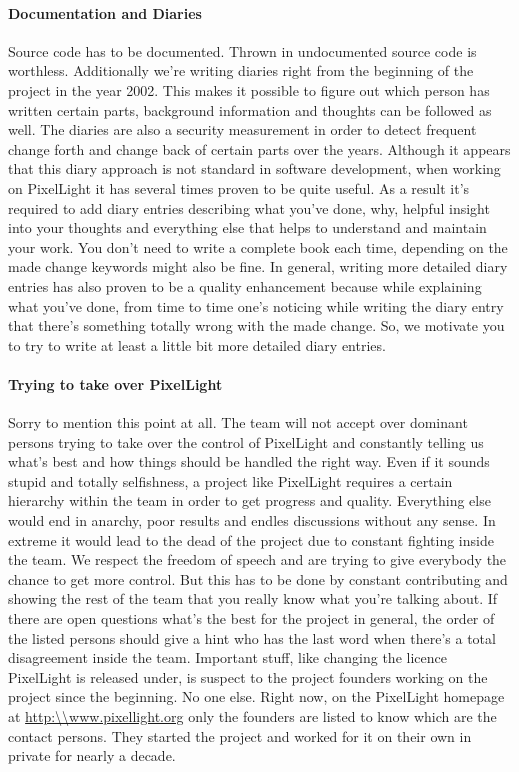\paragraph{Documentation and Diaries}
Source code has to be documented. Thrown in undocumented source code is worthless. Additionally we're writing diaries right from the beginning of the project in the year 2002. This makes it possible to figure out which person has written certain parts, background information and thoughts can be followed as well. The diaries are also a security measurement in order to detect frequent change forth and change back of certain parts over the years. Although it appears that this diary approach is not standard in software development, when working on PixelLight it has several times proven to be quite useful. As a result it's required to add diary entries describing what you've done, why, helpful insight into your thoughts and everything else that helps to understand and maintain your work. You don't need to write a complete book each time, depending on the made change keywords might also be fine. In general, writing more detailed diary entries has also proven to be a quality enhancement because while explaining what you've done, from time to time one's noticing while writing the diary entry that there's something totally wrong with the made change. So, we motivate you to try to write at least a little bit more detailed diary entries.


\paragraph{Trying to take over PixelLight}
Sorry to mention this point at all. The team will not accept over dominant persons trying to take over the control of PixelLight and constantly telling us what's best and how things should be handled the right way. Even if it sounds stupid and totally selfishness, a project like PixelLight requires a certain hierarchy within the team in order to get progress and quality. Everything else would end in anarchy, poor results and endles discussions without any sense. In extreme it would lead to the dead of the project due to constant fighting inside the team. We respect the freedom of speech and are trying to give everybody the chance to get more control. But this has to be done by constant contributing and showing the rest of the team that you really know what you're talking about. If there are open questions what's the best for the project in general, the order of the listed persons should give a hint who has the last word when there's a total disagreement inside the team. Important stuff, like changing the licence PixelLight is released under, is suspect to the project founders working on the project since the beginning. No one else. Right now, on the PixelLight homepage at \url{http:\\www.pixellight.org} only the founders are listed to know which are the contact persons. They started the project and worked for it on their own in private for nearly a decade.




